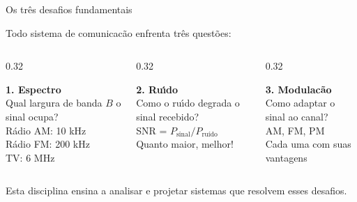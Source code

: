 \documentclass[aspectratio=169]{beamer}
\begin{document}
\begin{frame}{Os tr\^{e}s desafios fundamentais}

Todo sistema de comunicac\~{a}o enfrenta tr\^{e}s quest\~{o}es:

\vspace{0.1cm}

\begin{columns}
\begin{column}{0.32\textwidth}
\begin{center}
\textbf{\textcolor{cBlue}{\Large 1. Espectro}}\\[0.3cm]
\normalsize
Qual largura de banda $B$ o sinal ocupa?\\[0.2cm]
\small R\'{a}dio AM: 10 kHz\\
R\'{a}dio FM: 200 kHz\\
TV: 6 MHz
\end{center}
\end{column}
\begin{column}{0.32\textwidth}
\begin{center}
\textbf{\textcolor{cOrange}{\Large 2. Ru\'{\i}do}}\\[0.3cm]
\normalsize
Como o ru\'{\i}do degrada o sinal recebido?\\[0.2cm]
\small SNR = $P_{\text{sinal}}/P_{\text{ru\'{i}do}}$\\
Quanto maior, melhor!
\end{center}
\end{column}
\begin{column}{0.32\textwidth}
\begin{center}
\textbf{\textcolor{cTeal}{\Large 3. Modulac\~{a}o}}\\[0.3cm]
\normalsize
Como adaptar o sinal ao canal?\\[0.2cm]
\small AM, FM, PM\\
Cada uma com suas vantagens
\end{center}
\end{column}
\end{columns}

\vspace{0.2cm}

\begin{center}
\alert{Esta disciplina ensina a analisar e projetar sistemas que resolvem esses desafios.}
\end{center}
\end{frame}
\end{document}
